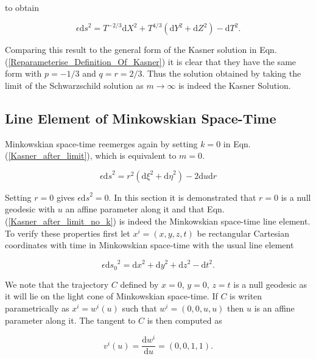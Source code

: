 \noindent to obtain

\begin{equation}\label{Our_Kasner} 
\epsilon {\mathrm{d}s}^2 = T^{-2/3} {\mathrm{d}X}^2 + T^{4/3} \left( \mathrm{d}Y^2 + \mathrm{d}Z^2 \right) - \mathrm{d}T^2.
\end{equation}

\noindent Comparing this result to the general form of the Kasner solution in Eqn.(\ref{Reparameterise_Definition_Of_Kasner}) it is clear that they have the same form with $p=-1/3$ and $q=r=2/3$. Thus the solution obtained by taking the limit of the Schwarzschild solution as $m \rightarrow \infty$ is indeed the Kasner Solution. 

\subsection{Line Element of Minkowskian Space-Time}

Minkowskian space-time reemerges again by setting $k = 0$ in Eqn.(\ref{Kasner_after_limit}), which is equivalent to $m = 0$. 

\begin{equation}\label{Kasner_after_limit_no_k}
\epsilon {\mathrm{d}s}^2 = r^2 ({\mathrm{d}\xi}^2 + {\mathrm{d}\eta}^2) - 2 {\mathrm{d}u}{\mathrm{d}r}
\end{equation}

\noindent Setting $r = 0$ gives $\epsilon {\mathrm{d}s}^2 = 0$. In this section it is demonstrated that $r = 0$ is a null geodesic with $u$ an affine parameter along it and that Eqn.(\ref{Kasner_after_limit_no_k}) is indeed the Minkowskian space-time line element. To verify these properties first let $x^i = (x,y,z,t)$ be rectangular Cartesian coordinates with time in Minkowskian space-time with the usual line element

\begin{equation*} 
\epsilon {\mathrm{d}s_0}^2 = {\mathrm{d}x}^2 + {\mathrm{d}y}^2 + {\mathrm{d}z}^2 - {\mathrm{d}t}^2.
\end{equation*} 

\noindent We note that the trajectory $C$  defined by $x = 0$, $y = 0$, $z = t$ is a null geodesic as it will lie on the light cone of Minkowskian space-time. If $C$ is writen parametrically as $x^i = w^i (u)$ such that $w^i = (0,0,u,u)$ then $u$ is an affine parameter along it. The tangent to $C$ is then computed as

\begin{equation*} 
v^i (u) = \frac{\mathrm{d} w^i}{\mathrm{d}u} = (0,0,1,1).
\end{equation*} 


